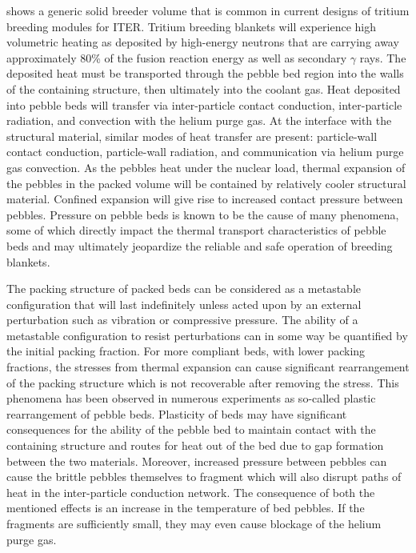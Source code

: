 
 shows a generic solid breeder volume that is common in current designs of tritium breeding modules for ITER. Tritium breeding blankets will experience high volumetric heating as deposited by high-energy neutrons that are carrying away approximately 80\% of the fusion reaction energy as well as secondary $\gamma$ rays. The deposited heat must be transported through the pebble bed region into the walls of the containing structure, then ultimately into the coolant gas. Heat deposited into pebble beds will transfer via inter-particle contact conduction, inter-particle radiation, and convection with the helium purge gas. At the interface with the structural material, similar modes of heat transfer are present: particle-wall contact conduction, particle-wall radiation, and communication via helium purge gas convection. As the pebbles heat under the nuclear load, thermal expansion of the pebbles in the packed volume will be contained by relatively cooler structural material. Confined expansion will give rise to increased contact pressure between pebbles. Pressure on pebble beds is known to be the cause of many phenomena, some of which directly impact the thermal transport characteristics of pebble beds and may ultimately jeopardize the reliable and safe operation of breeding blankets. 

The packing structure of packed beds can be considered as a metastable configuration that will last indefinitely unless acted upon by an external perturbation such as vibration or compressive pressure.\cite{Jaeger1996} The ability of a metastable configuration to resist perturbations can in some way be quantified by the initial packing fraction. For more compliant beds, with lower packing fractions, the stresses from thermal expansion can cause significant rearrangement of the packing structure which is not recoverable after removing the stress. This phenomena has been observed in numerous experiments as so-called plastic rearrangement of pebble beds.\cite{Reimann:2002kl,Reimann:2000tw,Zhang2015} Plasticity of beds may have significant consequences for the ability of the pebble bed to maintain contact with the containing structure and routes for heat out of the bed due to gap formation between the two materials. Moreover, increased pressure between pebbles can cause the brittle pebbles themselves to fragment which will also disrupt paths of heat in the inter-particle conduction network. The consequence of both the mentioned effects is an increase in the temperature of bed pebbles. If the fragments are sufficiently small, they may even cause blockage of the helium purge gas. 

